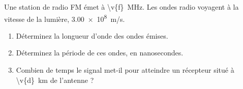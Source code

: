 Une station de radio FM émet à \qty{\v{f}}{MHz}. Les ondes radio voyagent à la vitesse de la lumière, \qty{3.00e8}{m/s}.

\begin{enumerate}[label=\alph*)]
    \item Déterminez la longueur d'onde des ondes émises.
    \item Déterminez la période de ces ondes, en nanosecondes.
    \item Combien de temps le signal met-il pour atteindre un récepteur situé à \qty{\v{d}}{km} de l'antenne ?
\end{enumerate}
